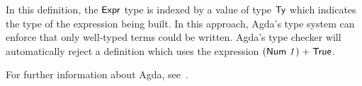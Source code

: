 \documentclass[sigconf]{acmart}
\theoremstyle{definition}
\newcommand{\D}[1]{\blue{\mathsf{#1}}}
\newcommand{\Con}[1]{\red{\mathsf{#1}}}
\newcommand{\F}[1]{\green{\mathsf{#1}}}
\newcommand{\V}[1]{\purple{\mathit{#1}}}
\begin{document}
In this definition, the \ensuremath{\D{Expr}} type is indexed by a value of type \ensuremath{\D{Ty}} which
indicates the type of the expression being built. In this approach, Agda's
type system can enforce that only well-typed terms could be written.
Agda's type checker will automatically reject a definition which uses the expression \ensuremath{(\Con{Num}\;\V{1})\;\F{+}\;\Con{True}}.

%


For further information about Agda, see~\cite{Norell2009,Stump16}.



\end{document}
